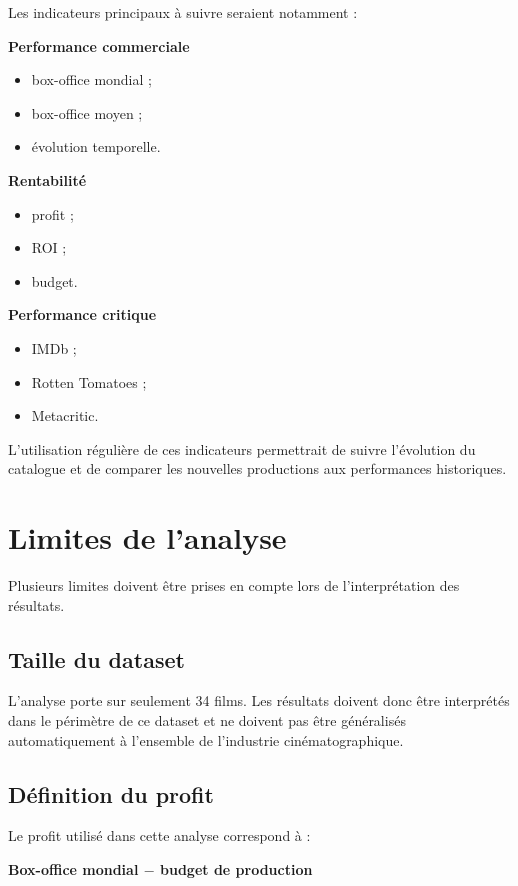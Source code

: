 \documentclass[a4paper,11pt]{article}
\begin{document}
Les indicateurs principaux à suivre seraient notamment :

\textbf{Performance commerciale}
\begin{itemize}
  \item box-office mondial ;
  \item box-office moyen ;
  \item évolution temporelle.
\end{itemize}

\textbf{Rentabilité}
\begin{itemize}
  \item profit ;
  \item ROI ;
  \item budget.
\end{itemize}

\textbf{Performance critique}
\begin{itemize}
  \item IMDb ;
  \item Rotten Tomatoes ;
  \item Metacritic.
\end{itemize}

L'utilisation régulière de ces indicateurs permettrait de suivre l'évolution
du catalogue et de comparer les nouvelles productions aux performances
historiques.

\section{Limites de l'analyse}

Plusieurs limites doivent être prises en compte lors de l'interprétation des
résultats.

\subsection{Taille du dataset}

L'analyse porte sur seulement 34 films. Les résultats doivent donc être
interprétés dans le périmètre de ce dataset et ne doivent pas être
généralisés automatiquement à l'ensemble de l'industrie cinématographique.

\subsection{Définition du profit}

Le profit utilisé dans cette analyse correspond à :
\begin{center}
\textbf{Box-office mondial $-$ budget de production}
\end{center}
\end{document}

